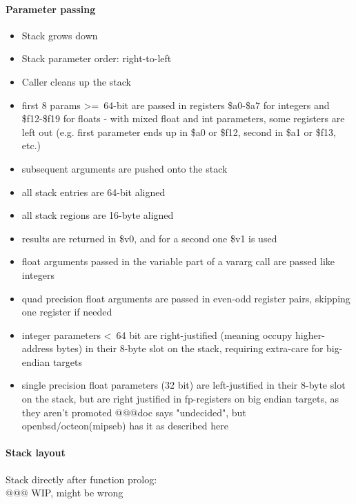 \paragraph{Parameter passing}

\begin{itemize}
\item Stack grows down
\item Stack parameter order: right-to-left
\item Caller cleans up the stack
\item first 8 params \textgreater=\ 64-bit are passed in registers \$a0-\$a7 for integers and \$f12-\$f19 for floats - with mixed float and int parameters,
some registers are left out (e.g. first parameter ends up in \$a0 or \$f12, second in \$a1 or \$f13, etc.)
\item subsequent arguments are pushed onto the stack
\item all stack entries are 64-bit aligned
\item all stack regions are 16-byte aligned
\item results are returned in \$v0, and for a second one \$v1 is used
\item float arguments passed in the variable part of a vararg call are passed like integers
\item quad precision float arguments are passed in even-odd register pairs, skipping one register if needed
\item integer parameters \textless\ 64 bit are right-justified (meaning occupy higher-address bytes) in their 8-byte slot on the stack, requiring extra-care for big-endian targets
\item single precision float parameters (32 bit) are left-justified in their 8-byte slot on the stack, but are right justified in fp-registers on big endian targets, as they aren't promoted @@@doc says "undecided", but openbsd/octeon(mipseb) has it as described here
\end{itemize}

\paragraph{Stack layout}

Stack directly after function prolog:\\
@@@ WIP, might be wrong

